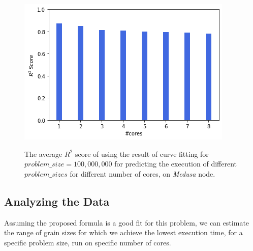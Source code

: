 \begin{figure}[H]
	\centering
	{\includegraphics[scale=.45]{images/hpx_for_loop/fitted/medusa_r2_error_all.png}}
	\caption{The average $R^2$ score of using the result of curve fitting for $problem\_size=100,000,000$ for predicting the execution of different $problem\_{sizes}$ for different number of cores, on \textit{Medusa} node.}\label{fig49}		
\end{figure}


%	
   



\vspace{\baselineskip}
\subsection{Analyzing the Data}
Assuming the proposed formula is a good fit for this problem, we can estimate the range of grain sizes for which we achieve the lowest execution time, for a specific problem size, run on specific number of cores.

